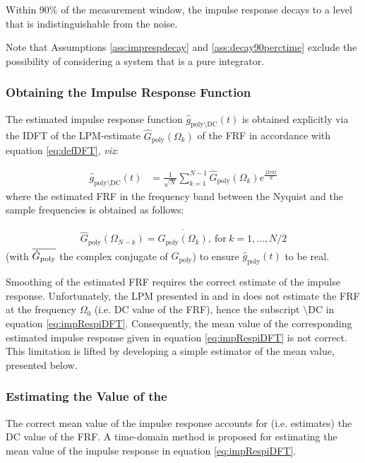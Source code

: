 \begin{assumption}\label{ass:decay90perctime}
Within $90\%$ of the measurement window, the impulse response decays
 to a level that is indistinguishable from the noise.
\end{assumption}

Note that Assumptions \ref{ass:imprespdecay} and \ref{ass:decay90perctime} exclude the possibility of considering a system that is a pure integrator.

\subsubsection{Obtaining the Impulse Response Function}

The estimated impulse response function  $\hat g_{\mathrm{poly}\setminus \mathrm{DC
}}(t)$ is obtained explicitly via the \gls{IDFT} of the \gls{LPM}-estimate $\hat G_\mathrm{poly}(\Omega_k)$ of the \gls{FRF} in accordance with equation \eqref{eq:defDFT}, \emph{viz}:

\begin{align}\label{eq:impRespiDFT}
\hat g_{\mathrm{poly}\setminus \mathrm{DC
}}(t) &= \frac{1}{\sqrt{N}}\sum_{k=1}^{N-1}\hat G_\mathrm{poly}(\Omega_k)e^{\frac{j2\pi kt}{N}}
\end{align}
where the estimated \gls{FRF} in the frequency band between  the Nyquist and the sample frequencies is obtained as follows:

\begin{align}
\hat G_\mathrm{poly}(\Omega_{N-k}) = \overline{\hat G_\mathrm{poly}(\Omega_k)},\ \text{for}\ k=1,\dots,N/2
\end{align}
(with $\overline{\hat G_\mathrm{poly}}$ the complex conjugate of $\hat G_\mathrm{poly}$) to ensure $\hat g_\mathrm{poly}(t)$ to be real.

Smoothing of the estimated \gls{FRF} requires the correct estimate of the impulse response. Unfortunately, the \gls{LPM} presented in  and in \citep{Schoukens2009LPM} does not estimate the \gls{FRF}  at the frequency $\Omega_0$ (i.e. \gls{DC} value of the \gls{FRF}), hence the subscript $\setminus\mathrm{DC}$ in equation \eqref{eq:impRespiDFT}. Consequently, the mean value of the corresponding estimated impulse response given in equation \eqref{eq:impRespiDFT} is not correct. 
This limitation is lifted by developing a simple estimator of the mean value, presented below.

\subsubsection{Estimating the  Value of the }\label{se:DCvalueEst}
The correct mean value of the impulse response accounts for (i.e. estimates) the \gls{DC} value of the \gls{FRF}. A time-domain method is proposed for estimating the mean value of the impulse response in equation \eqref{eq:impRespiDFT}. %

